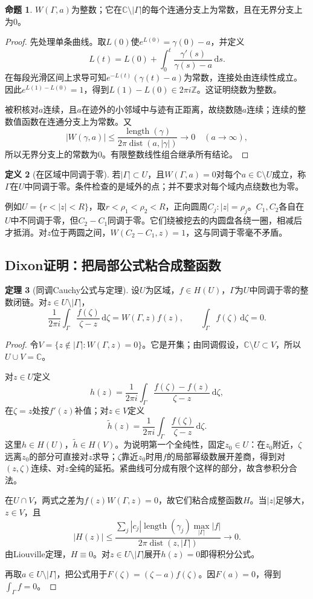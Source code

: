 \documentclass[11pt,a4paper,fontset=fandol]{ctexart}
\theoremstyle{definition}\newtheorem{theorem}{定理}[section]\newtheorem{proposition}[theorem]{命题}\newtheorem{definition}[theorem]{定义}
\newcommand{\C}{\mathbb C}\newcommand{\R}{\mathbb R}\newcommand{\Z}{\mathbb Z}\newcommand{\D}{\mathbb D}\newcommand{\dd}{\,\mathrm d}
\begin{document}
\begin{proposition}
$W(\Gamma,a)$为整数；它在$\C\setminus|\Gamma|$的每个连通分支上为常数，且在无界分支上为0。
\end{proposition}
\begin{proof}
先处理单条曲线。取$L(0)$使$e^{L(0)}=\gamma(0)-a$，并定义
\[L(t)=L(0)+\int_0^t\frac{\gamma'(s)}{\gamma(s)-a}\dd s.\]
在每段光滑区间上求导可知$e^{-L(t)}(\gamma(t)-a)$为常数，连接处由连续性成立。因此$e^{L(1)-L(0)}=1$，得到$L(1)-L(0)\in2\pi i\Z$。这证明绕数为整数。

被积核对$a$连续，且$a$在迹外的小邻域中与迹有正距离，故绕数随$a$连续；连续的整数值函数在连通分支上为常数。又
\[|W(\gamma,a)|\le\frac{\operatorname{length}(\gamma)}{2\pi\operatorname{dist}(a,|\gamma|)}\to0\quad(a\to\infty),\]
所以无界分支上的常数为0。有限整数线性组合继承所有结论。
\end{proof}

\begin{definition}[在区域中同调于零]
若$|\Gamma|\subset U$，且$W(\Gamma,a)=0$对每个$a\in\C\setminus U$成立，称$\Gamma$在$U$中同调于零。条件检查的是域外的点；并不要求对每个域内点绕数也为零。
\end{definition}

例如$U=\{r<|z|<R\}$，取$r<\rho_1<\rho_2<R$，正向圆周$C_j:|z|=\rho_j$。$C_1,C_2$各自在$U$中不同调于零，但$C_2-C_1$同调于零。它们绕被挖去的内圆盘各绕一圈，相减后才抵消。对$z$位于两圆之间，$W(C_2-C_1,z)=1$，这与同调于零毫不矛盾。

\subsection{Dixon证明：把局部公式粘合成整函数}
\begin{theorem}[同调Cauchy公式与定理]
设$U$为区域，$f\in H(U)$，$\Gamma$为$U$中同调于零的整数闭链。对$z\in U\setminus|\Gamma|$，
\[\frac1{2\pi i}\int_\Gamma\frac{f(\zeta)}{\zeta-z}\dd\zeta=W(\Gamma,z)f(z),\qquad
\int_\Gamma f(\zeta)\dd\zeta=0.\]
\end{theorem}
\begin{proof}
令$V=\{z\notin|\Gamma|:W(\Gamma,z)=0\}$。它是开集；由同调假设，$\C\setminus U\subset V$，所以$U\cup V=\C$。

对$z\in U$定义
\[h(z)=\frac1{2\pi i}\int_\Gamma\frac{f(\zeta)-f(z)}{\zeta-z}\dd\zeta,\]
在$\zeta=z$处按$f'(z)$补值；对$z\in V$定义
\[\widetilde h(z)=\frac1{2\pi i}\int_\Gamma\frac{f(\zeta)}{\zeta-z}\dd\zeta.\]
这里$h\in H(U)$，$\widetilde h\in H(V)$。为说明第一个全纯性，固定$z_0\in U$：在$z_0$附近，$\zeta$远离$z_0$的部分可直接对$z$求导；$\zeta$靠近$z_0$时用$f$的局部幂级数展开差商，得到对$(z,\zeta)$连续、对$z$全纯的延拓。紧曲线可分成有限个这样的部分，故含参积分合法。

在$U\cap V$，两式之差为$f(z)W(\Gamma,z)=0$，故它们粘合成整函数$H$。当$|z|$足够大，$z\in V$，且
\[|H(z)|\le\frac{\sum_j|c_j|\operatorname{length}(\gamma_j)\max_{|\Gamma|}|f|}
{2\pi\operatorname{dist}(z,|\Gamma|)}\to0.\]
由Liouville定理，$H\equiv0$。对$z\in U\setminus|\Gamma|$展开$h(z)=0$即得积分公式。

再取$a\in U\setminus|\Gamma|$，把公式用于$F(\zeta)=(\zeta-a)f(\zeta)$。因$F(a)=0$，得到$\int_\Gamma f=0$。
\end{proof}
\end{document}
